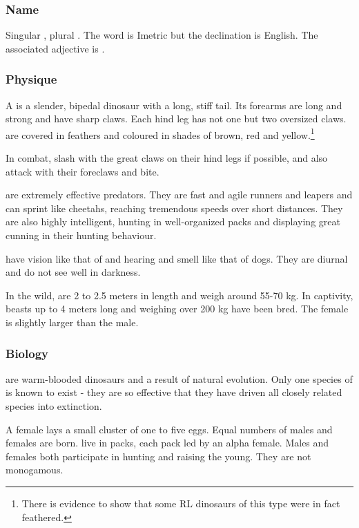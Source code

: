 \subsubsection{Name}
Singular , plural \emph{\nycans{}}. The word is Imetric but the declination is English. The associated adjective is \emph{\nycan{}}. %

\subsubsection{Physique}
A \nycan{} is a slender, bipedal dinosaur with a long, stiff tail. Its forearms are long and strong and have sharp claws. Each hind leg has not one but two oversized claws. \Nycans{} are covered in feathers and coloured in shades of brown, red and yellow.\footnote{There is evidence to show that some RL dinosaurs of this type were in fact feathered.} 

In combat, \nycans{} slash with the great claws on their hind legs if possible, and also attack with their foreclaws and bite. 

\Nycans{} are extremely effective predators. They are fast and agile runners and leapers and can sprint like cheetahs, reaching tremendous speeds over short distances. They are also highly intelligent, hunting in well-organized packs and displaying great cunning in their hunting behaviour. 

\Nycans{} have vision like that of \humans{} and hearing and smell like that of dogs. They are diurnal and do not see well in darkness. 

In the wild, \nycans{} are 2 to 2.5 meters in length and weigh around 55-70 kg. In captivity, beasts up to 4 meters long and weighing over 200 kg have been bred. The female is slightly larger than the male. 

\subsubsection{Biology}
\Nycans{} are warm-blooded dinosaurs and a result of natural evolution. Only one species of \nycan{} is known to exist - they are so effective that they have driven all closely related species into extinction. 

A \nycan{} female lays a small cluster of one to five eggs. Equal numbers of males and females are born. \Nycans{} live in packs, each pack led by an alpha female. Males and females both participate in hunting and raising the young. They are not monogamous. 

